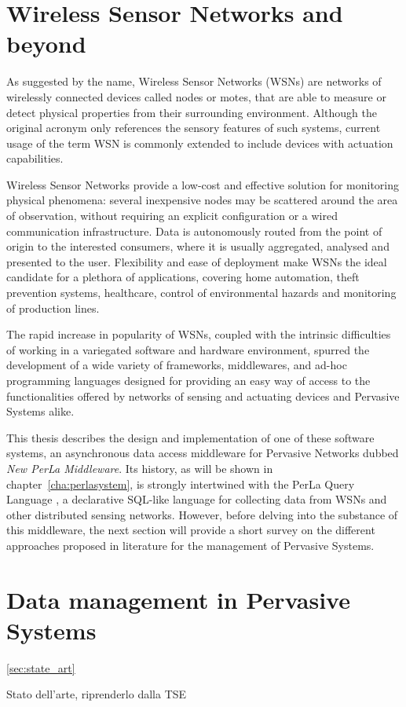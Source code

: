 \section{Wireless Sensor Networks and beyond}

As suggested by the name, Wireless Sensor Networks (WSNs) are networks of
wirelessly connected devices called nodes or motes, that are able to measure or
detect physical properties from their surrounding environment. Although the
original acronym only references the sensory features of such systems, current
usage of the term WSN is commonly extended to include devices with actuation
capabilities.

Wireless Sensor Networks provide a low-cost and effective solution for
monitoring physical phenomena: several inexpensive nodes may be scattered
around the area of observation, without requiring an explicit configuration or
a wired communication infrastructure. Data is autonomously routed from the
point of origin to the interested consumers, where it is usually aggregated,
analysed and presented to the user. Flexibility and ease of deployment make
WSNs the ideal candidate for a plethora of applications, covering home
automation, theft prevention systems, healthcare, control of environmental
hazards and monitoring of production lines.

The rapid increase in popularity of WSNs, coupled with the intrinsic
difficulties of working in a variegated software and hardware environment,
spurred the development of a wide variety of frameworks, middlewares, and
ad-hoc programming languages designed for providing an easy way of access to
the functionalities offered by networks of sensing and actuating devices and
Pervasive Systems alike.

This thesis describes the design and implementation of one of these software
systems, an asynchronous data access middleware for Pervasive Networks dubbed
\textit{New PerLa Middleware}. Its history, as will be shown in
chapter~\ref{cha:perlasystem}, is strongly intertwined with the PerLa Query
Language \cite{tse_perla}, a declarative SQL-like language for collecting data
from WSNs and other distributed sensing networks. However, before delving into
the substance of this middleware, the next section will provide a short survey
on the different approaches proposed in literature for the management of
Pervasive Systems.


\section{Data management in Pervasive Systems}
\ref{sec:state_art}

Stato dell'arte, riprenderlo dalla TSE
